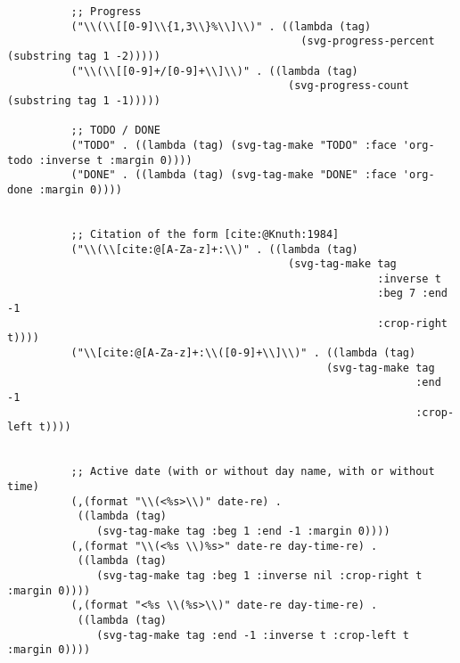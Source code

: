\documentclass[11pt]{article}
\begin{document}
\begin{verbatim}
          ;; Progress
          ("\\(\\[[0-9]\\{1,3\\}%\\]\\)" . ((lambda (tag)
                                              (svg-progress-percent (substring tag 1 -2)))))
          ("\\(\\[[0-9]+/[0-9]+\\]\\)" . ((lambda (tag)
                                            (svg-progress-count (substring tag 1 -1)))))

          ;; TODO / DONE
          ("TODO" . ((lambda (tag) (svg-tag-make "TODO" :face 'org-todo :inverse t :margin 0))))
          ("DONE" . ((lambda (tag) (svg-tag-make "DONE" :face 'org-done :margin 0))))


          ;; Citation of the form [cite:@Knuth:1984]
          ("\\(\\[cite:@[A-Za-z]+:\\)" . ((lambda (tag)
                                            (svg-tag-make tag
                                                          :inverse t
                                                          :beg 7 :end -1
                                                          :crop-right t))))
          ("\\[cite:@[A-Za-z]+:\\([0-9]+\\]\\)" . ((lambda (tag)
                                                  (svg-tag-make tag
                                                                :end -1
                                                                :crop-left t))))


          ;; Active date (with or without day name, with or without time)
          (,(format "\\(<%s>\\)" date-re) .
           ((lambda (tag)
              (svg-tag-make tag :beg 1 :end -1 :margin 0))))
          (,(format "\\(<%s \\)%s>" date-re day-time-re) .
           ((lambda (tag)
              (svg-tag-make tag :beg 1 :inverse nil :crop-right t :margin 0))))
          (,(format "<%s \\(%s>\\)" date-re day-time-re) .
           ((lambda (tag)
              (svg-tag-make tag :end -1 :inverse t :crop-left t :margin 0))))


\end{verbatim}
\end{document}
